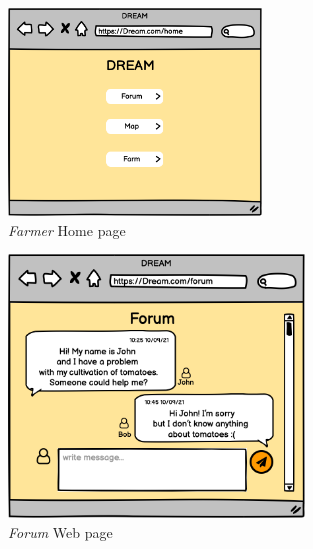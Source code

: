 \begin{figure}[H]
    \begin{center}
    \includegraphics[width=0.6\textwidth]{mockups/FHome.png}
    \caption{\emph{Farmer} Home page}
    \label{fig:homepage}
    \end{center}
\end{figure}

\begin{figure}[H]
    \begin{center}
    \includegraphics[width=0.7\textwidth]{mockups/Forum.png}
    \caption{\emph{Forum} Web page}
    \label{fig:forum}
    \end{center}
\end{figure}

